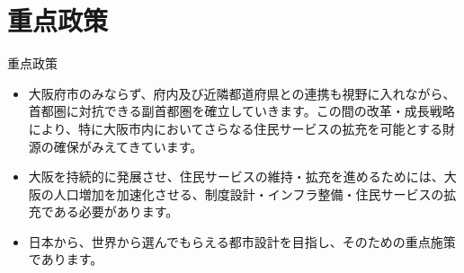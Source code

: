 \documentclass[dvipdfmx]{beamer}
\begin{document}
\section{重点政策}
    \begin{frame}
        \sectionpage
    \end{frame}

    \begin{frame}{重点政策}{}
        \begin{small}
            \begin{itemize}
                \setlength{\itemsep}{2mm}
                \item 大阪府市のみならず、府内及び近隣都道府県との連携も視野に入れながら、首都圏に対抗できる副首都圏を確立していきます。この間の改革・成長戦略により、特に大阪市内においてさらなる住民サービスの拡充を可能とする財源の確保がみえてきています。
                \item 大阪を持続的に発展させ、住民サービスの維持・拡充を進めるためには、大阪の人口増加を加速化させる、制度設計・インフラ整備・住民サービスの拡充である必要があります。
                \item 日本から、世界から選んでもらえる都市設計を目指し、そのための重点施策であります。
            \end{itemize}
        \end{small}
    \end{frame}
\end{document}
